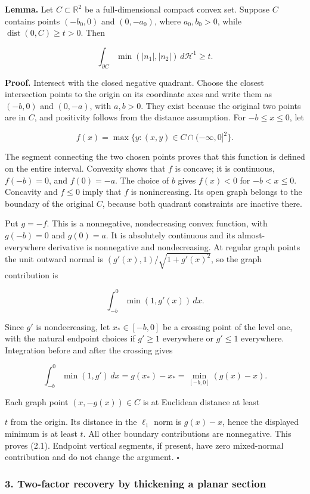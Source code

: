 \documentclass[
  11pt,
]{article}
\begin{document}
\textbf{Lemma.} Let \(C\subset\mathbb R^2\) be a full-dimensional
compact convex set. Suppose \(C\) contains points \((-b_0,0)\) and
\((0,-a_0)\), where \(a_0,b_0>0\), while
\(\operatorname{dist}(0,C)\ge t>0\). Then

\[
\int_{\partial C}\min(|n_1|,|n_2|)\,d\mathcal H^1\ge t. \tag{2.1}
\]

\textbf{Proof.} Intersect with the closed negative quadrant. Choose the
closest intersection points to the origin on its coordinate axes and
write them as \((-b,0)\) and \((0,-a)\), with \(a,b>0\). They exist
because the original two points are in \(C\), and positivity follows
from the distance assumption. For \(-b\le x\le0\), let

\[
 f(x)=\max\{y:(x,y)\in C\cap(-\infty,0]^2\}.
\]

The segment connecting the two chosen points proves that this function
is defined on the entire interval. Convexity shows that \(f\) is
concave; it is continuous, \(f(-b)=0\), and \(f(0)=-a\). The choice of
\(b\) gives \(f(x)<0\) for \(-b<x\le0\). Concavity and \(f\le0\) imply
that \(f\) is nonincreasing. Its open graph belongs to the boundary of
the original \(C\), because both quadrant constraints are inactive
there.

Put \(g=-f\). This is a nonnegative, nondecreasing convex function, with
\(g(-b)=0\) and \(g(0)=a\). It is absolutely continuous and its
almost-everywhere derivative is nonnegative and nondecreasing. At
regular graph points the unit outward normal is
\((g'(x),1)/\sqrt{1+g'(x)^2}\), so the graph contribution is

\[
\int_{-b}^0\min(1,g'(x))\,dx.
\]

Since \(g'\) is nondecreasing, let \(x_*\in[-b,0]\) be a crossing point
of the level one, with the natural endpoint choices if \(g'\ge1\)
everywhere or \(g'\le1\) everywhere. Integration before and after the
crossing gives

\[
\int_{-b}^0\min(1,g')\,dx=g(x_*)-x_*
                      =\min_{[-b,0]}(g(x)-x).
\]

Each graph point \((x,-g(x))\in C\) is at Euclidean distance at least

\(t\) from the origin. Its distance in the \(\ell_1\) norm is
\(g(x)-x\), hence the displayed minimum is at least \(t\). All other
boundary contributions are nonnegative. This proves (2.1). Endpoint
vertical segments, if present, have zero mixed-normal contribution and
do not change the argument. \(\square\)

\subsubsection{3. Two-factor recovery by thickening a planar
section}\label{two-factor-recovery-by-thickening-a-planar-section}
\end{document}
